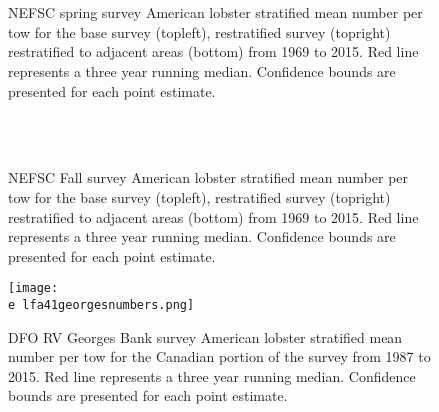 \documentclass[11pt]{article}
\newcommand{\e}{/backup/bio_data/bio.lobster/figures/} %
\begin{document}
\begin{figure}
\centering
{}
\\
\\

\caption{NEFSC spring survey American lobster stratified mean number per tow for the base survey (topleft), restratified survey (topright) restratified to adjacent areas (bottom) from 1969 to 2015. Red line represents a three year running median. Confidence bounds are presented for each point estimate. }
\end{figure}
\clearpage


\begin{figure}
\centering
{}
\\
\\

\caption{NEFSC Fall survey American lobster stratified mean number per tow for the base survey (topleft), restratified survey (topright) restratified to adjacent areas (bottom) from 1969 to 2015. Red line represents a three year running median. Confidence bounds are presented for each point estimate. }
\end{figure}
\clearpage

\begin{figure}

    \texttt{[image: \\e lfa41georgesnumbers.png]}
    \caption{DFO RV Georges Bank survey American lobster stratified mean number per tow for the Canadian portion of the survey from 1987 to 2015. Red line represents a three year running median. Confidence bounds are presented for each point estimate.}

\end{figure}
\end{document}
